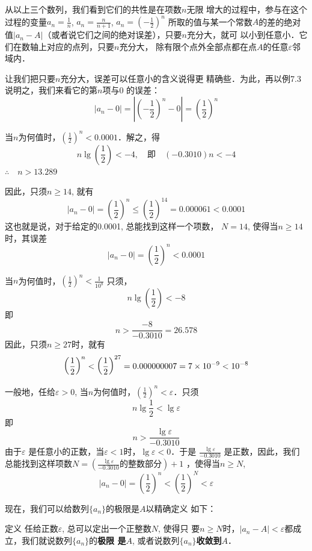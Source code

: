 从以上三个数列，我们看到它们的共性是在项数$n$无限
增大的过程中，参与在这个过程的变量$a_n=\frac{1}{n}$, $a_n=\frac{n}{n+1}$, 
$a_n=\left(-\frac{1}{2}\right)^n$
所取的值与某一个常数$A$的差的绝对值$|a_n-
A|$（或者说它们之间的绝对误差），只要$n$充分大，就可
以小到任意小．它们在数轴上对应的点列，只要$n$充分大，
除有限个点外全部点都在点$A$的任意$\varepsilon$邻域内．

让我们把只要$n$充分大，误差可以任意小的含义说得更
精确些．为此，再以例7.3说明之，我们来看它的第$n$项与0
的误差：
\[|a_n-0|=\left|\left(-\frac{1}{2}\right)^n-0\right|=\left(\frac{1}{2}\right)^n\]

当$n$为何值时，$\left(\frac{1}{2}\right)^n<0.0001$．解之，得
\[n\lg\left(\frac{1}{2}\right)<-4,\quad \text{即}\quad (-0.3010)n<-4\]
$\therefore\quad n>13.289$

因此，只须$n\ge 14$, 就有
\[|a_n-0|=\left(\frac{1}{2}\right)^n\le \left(\frac{1}{2}\right)^{14}=0.000061<0.0001\]
这也就是说，对于给定的0.0001, 总能找到这样一个项数，
$N=14$, 使得当$n\ge14$时，其误差
\[|a_n-0|=\left(\frac{1}{2}\right)^n<0.0001\]

当$n$为何值时，$\left(\frac{1}{2}\right)^n<\frac{1}{10^8}$
只须，
\[n\lg\left(\frac{1}{2}\right)<-8\]
即
\[n>\frac{-8}{-0.3010}=26.578\]
因此，只须$n\ge 27$时，就有
\[\left(\dfrac{1}{2}\right)^n<\left(\dfrac{1}{2}\right)^{27}=0.000000007=7\times 10^{-9}<10^{-8}\]

一般地，任给$\varepsilon >0$, 当$n$为何值时，$\left(\frac{1}{2}\right)^n<\varepsilon$．只须
\[n\lg \frac{1}{2}<\lg\varepsilon\] 
即
\[n>\frac{\lg\varepsilon}{-0.3010}\]
由于$\varepsilon$ 是任意小的正数，当$\varepsilon <1$时，$\lg\varepsilon <0$．于是
$\frac{\lg\varepsilon}{-0.3010}$
是正数，因此，我们总能找到这样项数$N=\left(\frac{\lg\varepsilon}{-0.3010}\text{的整数部分}\right)+1$
，使得当$n\ge N$,
\[|a_n-0|=\left(\frac{1}{2}\right)^n<\left(\frac{1}{2}\right)^N<\varepsilon  \]

现在，我们可以给数列$\{a_n\}$的极限是$A$以精确定义
如下：

\begin{blk}{定义}
    任给正数$\varepsilon$, 总可以定出一个正整数$N$, 使得只
要$n\ge N$时，$|a_n-A|<\varepsilon$都成立，我们就说数列$\{a_n\}$的\textbf{极限
是}$A$, 或者说数列$\{a_n\}$\textbf{收敛到}$A$．
\end{blk}
 
